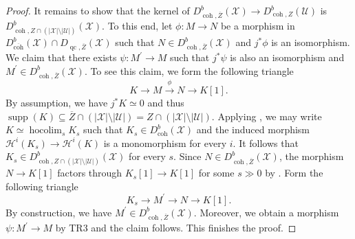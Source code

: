 \documentclass[11pt]{amsart}
\theoremstyle{plain}
\theoremstyle{definition}
\numberwithin{equation}{section}
\numberwithin{theorem}{section}
\begin{document}
\begin{proof}
    It remains to show that the kernel of $D^b_{\operatorname{coh},\overline{Z}} (\mathcal{X}) \to D^b_{\operatorname{coh},Z}(\mathcal{U})$ is $D^b_{\operatorname{coh},Z\cap (|\mathcal{X}|\setminus |\mathcal{U}|)} (\mathcal{X})$. 
    To this end, let $\phi\colon M\to N$ be a morphism in $D^b_{\overline{\operatorname{coh}}} (\mathcal{X})\cap D_{\operatorname{qc},\overline{Z}}(\mathcal{X})$ such that $N\in D^b_{\operatorname{coh},\overline{Z}} (\mathcal{X})$ and $j^\ast\phi$ is an isomorphism. 
    We claim that there exists $\psi\colon M^\prime\to M$ such that $j^\ast\psi$ is also an isomorphism and $M^\prime\in D^b_{\operatorname{coh},\overline{Z}} (\mathcal{X})$. 
    To see this claim, we form the following triangle
    \begin{displaymath}
        K\longrightarrow M\overset{\phi}{\longrightarrow} N\longrightarrow K[1].
    \end{displaymath}
    By assumption, we have $j^\ast K\simeq 0$ and thus $\operatorname{supp}(K)\subseteq\overline{Z}\cap(|\mathcal{X}|\setminus |\mathcal{U}|)=Z\cap (|\mathcal{X}|\setminus |\mathcal{U}|)$. 
    Applying \cite[Lemma A.3]{Hall:2022}, we may write $K\simeq\operatorname{hocolim}_s K_s$ such that $K_s\in D^b_{\operatorname{coh}} (\mathcal{X})$ and the induced morphism $\mathcal{H}^{i}(K_s)\to\mathcal{H}^i(K)$ is a monomorphism for every $i$. 
    It follows that $K_s\in D^b_{\operatorname{coh},Z\cap (|\mathcal{X}|\setminus |\mathcal{U}|)} (\mathcal{X})$ for every $s$. Since $N\in D^b_{\operatorname{coh},\overline{Z}} (\mathcal{X})$, the morphism $N\to K[1]$ factors through $K_s[1]\to K[1]$ for some $s\gg 0$ by \cite[Lemma 1.2]{Hall/Rydh:2017}. 
    Form the following triangle
    \begin{displaymath}
        K_s\longrightarrow M^\prime\longrightarrow N\longrightarrow K[1].
    \end{displaymath}
    By construction, we have $M^\prime\in D^b_{\operatorname{coh},\overline{Z}} (\mathcal{X})$.
    Moreover, we obtain a morphism $\psi\colon M^\prime\to M$ by TR3 and the claim follows. 
    This finishes the proof.
\end{proof}



\end{document}
